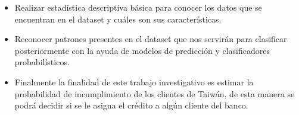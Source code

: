 \documentclass[12pt]{report}
\renewcommand{\_}{\kern-1.5pt\textunderscore\kern-1.5pt}
\begin{document}
\vspace{\baselineskip}

\vspace{\baselineskip}

\vspace{\baselineskip}
\begin{itemize}
	\item Realizar estadística descriptiva básica para conocer los datos que se encuentran en el dataset y cuáles son sus características.
	\item Reconocer patrones presentes en el dataset que nos servirán para clasificar posteriormente con la ayuda de modelos de predicción y clasificadores probabilísticos.
	\item Finalmente la finalidad de este trabajo investigativo es estimar la probabilidad de incumplimiento de los clientes de Taiwán, de esta manera se podrá decidir si se le asigna el crédito a algún cliente del banco.
\end{itemize}

\vspace{\baselineskip}

\vspace{\baselineskip}

\vspace{\baselineskip}

\vspace{\baselineskip}

\vspace{\baselineskip}

\vspace{\baselineskip}

\vspace{\baselineskip}

\vspace{\baselineskip}

\vspace{\baselineskip}

\vspace{\baselineskip}

\vspace{\baselineskip}

\vspace{\baselineskip}

\vspace{\baselineskip}

\vspace{\baselineskip}

\vspace{\baselineskip}
\end{document}

